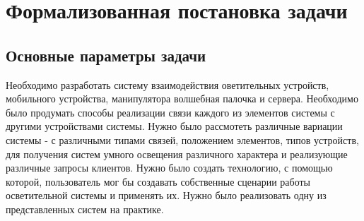 \chapter{Формализованная постановка задачи}
 \label{cha:Formal}
 \section{Основные параметры задачи}
 
Необходимо разработать систему взаимодействия оветительных устройств, мобильного устройства, манипулятора волшебная палочка и сервера. Необходимо было продумать способы реализации связи каждого из элементов системы с другими устройствами системы. Нужно было рассмотеть различные вариации системы - с различными типами связей, положением элементов, типов устройств, для получения систем умного освещения различного характера и реализующие различные запросы клиентов. Нужно было создать технологию, с помощью которой, пользователь мог бы создавать собственные сценарии работы осветительной системы и применять их. Нужно было реализовать одну из представленных систем на практике.